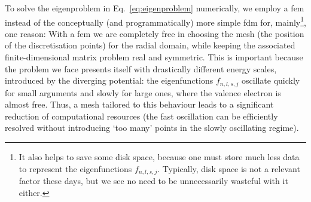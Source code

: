 \documentclass[fontsize=12pt,
               twoside=false,
               BCOR=0mm,
               DIV=14,
               overfullrule=true, %
               toc=bibliography,
               headinclude=true,
               footinclude=false]{scrartcl}
\numberwithin{equation}{section}
\begin{document}
    To solve the eigenproblem in Eq.~\eqref{eq:eigenproblem} numerically, we
    employ a \ac{fem} instead of the conceptually (and programmatically) more
    simple \ac{fdm} for, mainly\footnote{It also helps to save some disk space,
    because one must store much less data to represent the eigenfunctions
    $f_{n,l,s,j}$. Typically, disk space is not a relevant factor these days,
    but we see no need to be unnecessarily wasteful with it either.}, one
    reason: With a \ac{fem} we are completely free in choosing the mesh (the
    position of the discretisation points) for the radial domain, while keeping
    the associated finite-dimensional matrix problem real and symmetric. This
    is important because the problem we face presents itself with drastically
    different energy scales, introduced by the diverging potential: the
    eigenfunctions $f_{n,l,s,j}$ oscillate quickly for small arguments and
    slowly for large ones, where the valence electron is almost free. Thus, a
    mesh tailored to this behaviour leads to a significant reduction of
    computational resources (the fast oscillation can be efficiently resolved
    without introducing `too many' points in the slowly oscillating regime).
\end{document}

